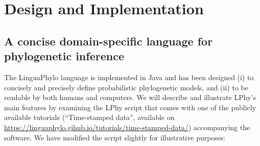 \documentclass[10pt,letterpaper,table]{article}
\begin{document}

\section*{Design and Implementation}

\subsection*{A concise domain-specific language for phylogenetic inference}



The LinguaPhylo language is implemented in Java and has been designed
(i) to concisely and precisely define probabilistic phylogenetic
models, and (ii) to be readable by both humans and computers.
We will describe and illustrate LPhy's main features by examining the
LPhy script that comes with one of the publicly available tutorials
(``Time-stamped data'', available on
\url{https://linguaphylo.gihub.io/tutorials/time-stamped-data/})
accompanying the software.
We have  modified the script slightly for illustrative purposes:
\end{document}
